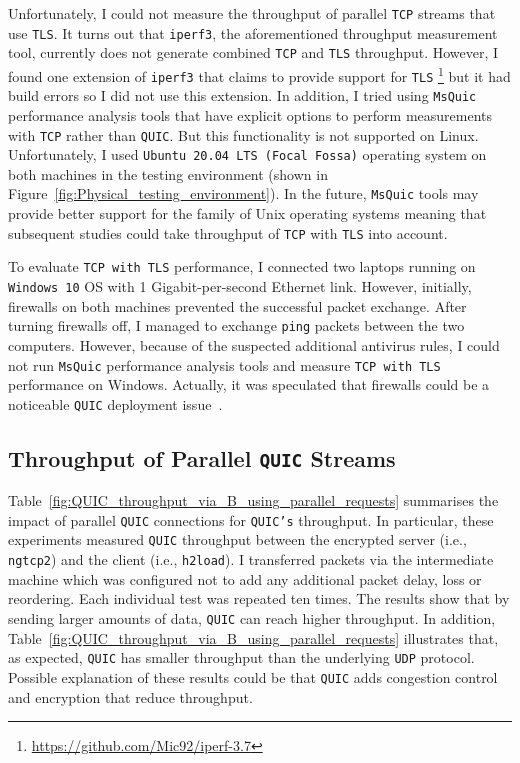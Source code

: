 \documentclass[12pt,a4paper,twoside,openright]{report}
\begin{document}
Unfortunately, I could not measure the throughput of parallel \texttt{TCP} streams that use \texttt{TLS}.
It turns out that \texttt{iperf3}, the aforementioned throughput measurement tool, currently does not generate combined \texttt{TCP} and \texttt{TLS} throughput.
However, I found one extension of \texttt{iperf3} that claims to provide support for \texttt{TLS} \footnote{\url{https://github.com/Mic92/iperf-3.7}} but it had build errors so I did not use this extension.
In addition, I tried using \texttt{MsQuic} performance analysis tools that have explicit options to perform measurements with \texttt{TCP} rather than \texttt{QUIC}. 
But this functionality is not supported on Linux.
Unfortunately, I used \texttt{Ubuntu 20.04 LTS (Focal Fossa)} operating system on both machines in the testing environment (shown in Figure~\ref{fig:Physical_testing_environment}).
In the future, \texttt{MsQuic} tools may provide better support for the family of Unix operating systems meaning that subsequent studies could take throughput of \texttt{TCP} with \texttt{TLS} into account.

To evaluate \texttt{TCP with TLS} performance, I connected two laptops running on \texttt{Windows 10} OS with 1 Gigabit-per-second Ethernet link.
However, initially, firewalls on both machines prevented the successful packet exchange.
After turning firewalls off, I managed to exchange \texttt{ping} packets between the two computers.
However, because of the suspected additional antivirus rules, I could not run \texttt{MsQuic} performance analysis tools and measure \texttt{TCP with TLS} performance on Windows.
Actually, it was speculated that firewalls could be a noticeable \texttt{QUIC} deployment issue~\cite{The_QUIC_Transport_Protocol_Design_and_Internet-Scale_Deployment}.

\subsection{Throughput of Parallel \texttt{QUIC} Streams}

Table~\ref{fig:QUIC_throughput_via_B_using_parallel_requests} summarises the impact of  parallel \texttt{QUIC} connections for \texttt{QUIC's} throughput.
In particular, these experiments measured \texttt{QUIC} throughput between the encrypted server (i.e., \texttt{ngtcp2}) and the client (i.e., \texttt{h2load}).
I transferred packets via the intermediate machine which was configured not to add any additional packet delay, loss or reordering.
Each individual test was repeated ten times.
The results show that by sending larger amounts of data, \texttt{QUIC} can reach higher throughput.
In addition, Table~\ref{fig:QUIC_throughput_via_B_using_parallel_requests} illustrates that, as expected, \texttt{QUIC} has smaller throughput than the underlying \texttt{UDP} protocol.
Possible explanation of these results could be that \texttt{QUIC} adds congestion control and encryption that reduce throughput.
\end{document}
